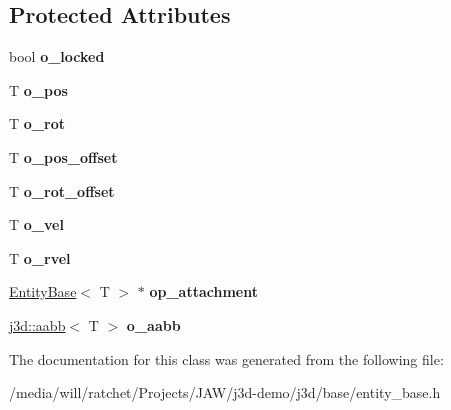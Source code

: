 \subsection*{Protected Attributes}
\begin{DoxyCompactItemize}
\item 
\hypertarget{classj3d_1_1base_1_1EntityBase_a723edac1cab8a39ed6153083bcd7487a}{}bool {\bfseries o\+\_\+locked}\label{classj3d_1_1base_1_1EntityBase_a723edac1cab8a39ed6153083bcd7487a}

\item 
\hypertarget{classj3d_1_1base_1_1EntityBase_aef5a3d9cf153970566a70ba3e868abdf}{}T {\bfseries o\+\_\+pos}\label{classj3d_1_1base_1_1EntityBase_aef5a3d9cf153970566a70ba3e868abdf}

\item 
\hypertarget{classj3d_1_1base_1_1EntityBase_aa3a47146742e4987e9e953ef4254908c}{}T {\bfseries o\+\_\+rot}\label{classj3d_1_1base_1_1EntityBase_aa3a47146742e4987e9e953ef4254908c}

\item 
\hypertarget{classj3d_1_1base_1_1EntityBase_ad759e3f7384e81593a062ebdbf4c8c69}{}T {\bfseries o\+\_\+pos\+\_\+offset}\label{classj3d_1_1base_1_1EntityBase_ad759e3f7384e81593a062ebdbf4c8c69}

\item 
\hypertarget{classj3d_1_1base_1_1EntityBase_aa31c9ae69db9516aef5fa41da0bbe634}{}T {\bfseries o\+\_\+rot\+\_\+offset}\label{classj3d_1_1base_1_1EntityBase_aa31c9ae69db9516aef5fa41da0bbe634}

\item 
\hypertarget{classj3d_1_1base_1_1EntityBase_ae99945875d6372e31b382100dd18a062}{}T {\bfseries o\+\_\+vel}\label{classj3d_1_1base_1_1EntityBase_ae99945875d6372e31b382100dd18a062}

\item 
\hypertarget{classj3d_1_1base_1_1EntityBase_a5139395dc5211ed7cc8fa20e9dd04da5}{}T {\bfseries o\+\_\+rvel}\label{classj3d_1_1base_1_1EntityBase_a5139395dc5211ed7cc8fa20e9dd04da5}

\item 
\hypertarget{classj3d_1_1base_1_1EntityBase_a545d6c77f50e1a8ea19fd3c0e47b0f3f}{}\hyperlink{classj3d_1_1base_1_1EntityBase}{Entity\+Base}$<$ T $>$ $\ast$ {\bfseries op\+\_\+attachment}\label{classj3d_1_1base_1_1EntityBase_a545d6c77f50e1a8ea19fd3c0e47b0f3f}

\item 
\hypertarget{classj3d_1_1base_1_1EntityBase_a98b4fee804003d891318c36f42838a00}{}\hyperlink{structj3d_1_1aabb}{j3d\+::aabb}$<$ T $>$ {\bfseries o\+\_\+aabb}\label{classj3d_1_1base_1_1EntityBase_a98b4fee804003d891318c36f42838a00}

\end{DoxyCompactItemize}


The documentation for this class was generated from the following file\+:\begin{DoxyCompactItemize}
\item 
/media/will/ratchet/\+Projects/\+J\+A\+W/j3d-\/demo/j3d/base/entity\+\_\+base.\+h\end{DoxyCompactItemize}
